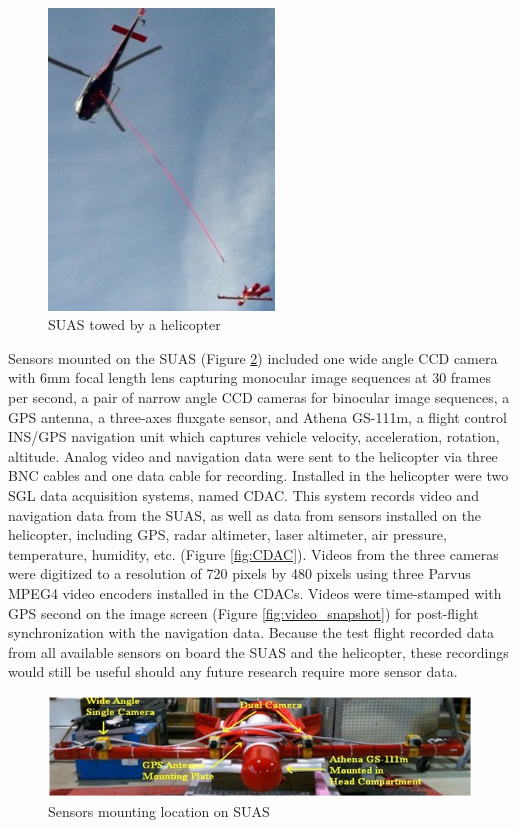 \begin{figure}[h]
\includegraphics[width=6cm,keepaspectratio=true]{./Figures/towed_SUAS.jpg}
\caption{SUAS towed by a helicopter}
\label{fig:towedSUAS}
\end{figure}
\FloatBarrier

Sensors mounted on the SUAS (Figure \ref{fig:SUAS}) included one wide
angle CCD camera with 6mm focal length lens capturing monocular image
sequences at 30 frames per second, a pair of narrow angle CCD cameras
for binocular image sequences, a GPS antenna, a three-axes fluxgate
sensor, and Athena GS-111m, a flight control INS/GPS navigation unit
\cite{_athena_????} which captures vehicle velocity, acceleration,
rotation, altitude. Analog video and navigation data were sent to the
helicopter via three BNC cables and one data cable for recording.
Installed in the helicopter were two SGL data acquisition systems,
named CDAC. This system records video and navigation data from the
SUAS, as well as data from sensors installed on the helicopter,
including GPS, radar altimeter, laser altimeter, air pressure,
temperature, humidity, etc. (Figure \ref{fig:CDAC}). Videos from the
three cameras were digitized to a resolution of 720 pixels by 480
pixels using three Parvus MPEG4 video encoders installed in the CDACs.
Videos were time-stamped with GPS second on the image screen (Figure
\ref{fig:video_snapshot}) for post-flight synchronization with the
navigation data. Because the test flight recorded data from all
available sensors on board the SUAS and the helicopter, these
recordings would still be useful should any future research require
more sensor data.

\begin{figure}[h]
  \centering
  \includegraphics[width=14cm,keepaspectratio=true]{./Figures/SUAS.jpg}
  \caption{Sensors mounting location on SUAS}
  \label{fig:SUAS}
\end{figure}

